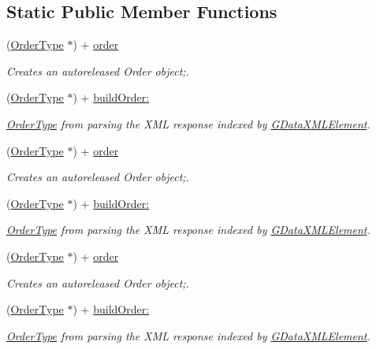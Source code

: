 \subsection*{Static Public Member Functions}
\begin{DoxyCompactItemize}
\item 
(\hyperlink{interface_order_type}{OrderType} $\ast$) + \hyperlink{interface_order_type_a06bdf1e6f862936fb835791d836a7f2f}{order}
\begin{DoxyCompactList}\small\item\em Creates an autoreleased Order object;. \item\end{DoxyCompactList}\item 
(\hyperlink{interface_order_type}{OrderType} $\ast$) + \hyperlink{interface_order_type_ab65489efc0a78811a8be5e524baff6c9}{buildOrder:}
\begin{DoxyCompactList}\small\item\em \hyperlink{interface_order_type}{OrderType} from parsing the XML response indexed by \hyperlink{interface_g_data_x_m_l_element}{GDataXMLElement}. \item\end{DoxyCompactList}\item 
(\hyperlink{interface_order_type}{OrderType} $\ast$) + \hyperlink{interface_order_type_a06bdf1e6f862936fb835791d836a7f2f}{order}
\begin{DoxyCompactList}\small\item\em Creates an autoreleased Order object;. \item\end{DoxyCompactList}\item 
(\hyperlink{interface_order_type}{OrderType} $\ast$) + \hyperlink{interface_order_type_ab65489efc0a78811a8be5e524baff6c9}{buildOrder:}
\begin{DoxyCompactList}\small\item\em \hyperlink{interface_order_type}{OrderType} from parsing the XML response indexed by \hyperlink{interface_g_data_x_m_l_element}{GDataXMLElement}. \item\end{DoxyCompactList}\item 
(\hyperlink{interface_order_type}{OrderType} $\ast$) + \hyperlink{interface_order_type_a06bdf1e6f862936fb835791d836a7f2f}{order}
\begin{DoxyCompactList}\small\item\em Creates an autoreleased Order object;. \item\end{DoxyCompactList}\item 
(\hyperlink{interface_order_type}{OrderType} $\ast$) + \hyperlink{interface_order_type_ab65489efc0a78811a8be5e524baff6c9}{buildOrder:}
\begin{DoxyCompactList}\small\item\em \hyperlink{interface_order_type}{OrderType} from parsing the XML response indexed by \hyperlink{interface_g_data_x_m_l_element}{GDataXMLElement}. \item\end{DoxyCompactList}\end{DoxyCompactItemize}
